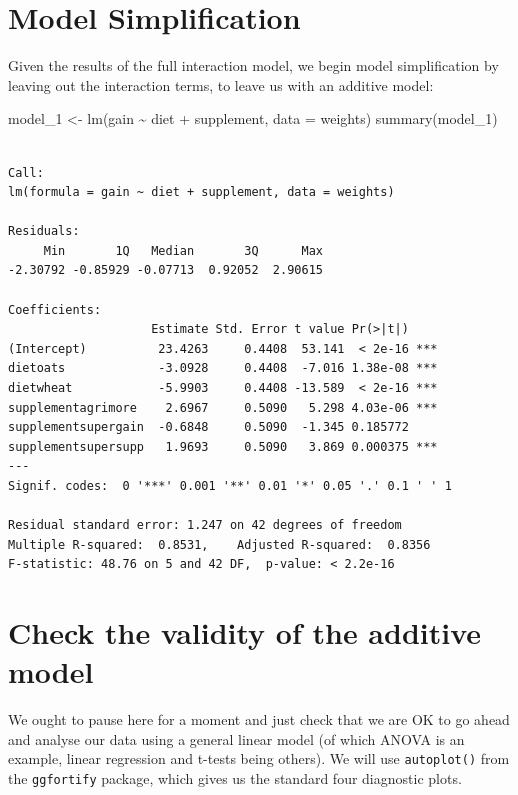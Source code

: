 \documentclass[
  letterpaper,
  DIV=11,
  numbers=noendperiod]{scrreprt}
\newenvironment{Shaded}{\begin{snugshade}}{\end{snugshade}}
\newcommand{\AttributeTok}[1]{\textcolor[rgb]{0.40,0.45,0.13}{#1}}
\newcommand{\FunctionTok}[1]{\textcolor[rgb]{0.28,0.35,0.67}{#1}}
\newcommand{\NormalTok}[1]{\textcolor[rgb]{0.00,0.23,0.31}{#1}}
\newcommand{\OtherTok}[1]{\textcolor[rgb]{0.00,0.23,0.31}{#1}}
\newcommand{\SpecialCharTok}[1]{\textcolor[rgb]{0.37,0.37,0.37}{#1}}
\begin{document}
\section{Model Simplification}\label{model-simplification}

Given the results of the full interaction model, we begin model
simplification by leaving out the interaction terms, to leave us with an
additive model:

\begin{Shaded}
\begin{Highlighting}[]
\NormalTok{model\_1 }\OtherTok{\textless{}{-}} \FunctionTok{lm}\NormalTok{(gain }\SpecialCharTok{\textasciitilde{}}\NormalTok{ diet }\SpecialCharTok{+}\NormalTok{ supplement, }\AttributeTok{data =}\NormalTok{ weights)}
\FunctionTok{summary}\NormalTok{(model\_1)}
\end{Highlighting}
\end{Shaded}

\begin{verbatim}

Call:
lm(formula = gain ~ diet + supplement, data = weights)

Residuals:
     Min       1Q   Median       3Q      Max 
-2.30792 -0.85929 -0.07713  0.92052  2.90615 

Coefficients:
                    Estimate Std. Error t value Pr(>|t|)    
(Intercept)          23.4263     0.4408  53.141  < 2e-16 ***
dietoats             -3.0928     0.4408  -7.016 1.38e-08 ***
dietwheat            -5.9903     0.4408 -13.589  < 2e-16 ***
supplementagrimore    2.6967     0.5090   5.298 4.03e-06 ***
supplementsupergain  -0.6848     0.5090  -1.345 0.185772    
supplementsupersupp   1.9693     0.5090   3.869 0.000375 ***
---
Signif. codes:  0 '***' 0.001 '**' 0.01 '*' 0.05 '.' 0.1 ' ' 1

Residual standard error: 1.247 on 42 degrees of freedom
Multiple R-squared:  0.8531,    Adjusted R-squared:  0.8356 
F-statistic: 48.76 on 5 and 42 DF,  p-value: < 2.2e-16
\end{verbatim}

\section{Check the validity of the additive
model}\label{check-the-validity-of-the-additive-model}

We ought to pause here for a moment and just check that we are OK to go
ahead and analyse our data using a general linear model (of which ANOVA
is an example, linear regression and t-tests being others). We will use
\texttt{autoplot()} from the \texttt{ggfortify} package, which gives us
the standard four diagnostic plots.
\end{document}
